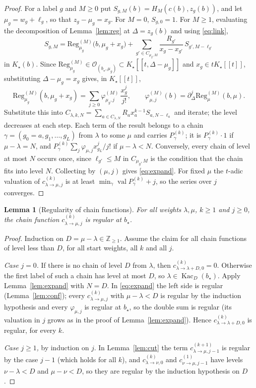 \documentclass[11pt]{article}
\newtheorem{lemma}[theorem]{Lemma}
\theoremstyle{definition}
\theoremstyle{remark}
\newcommand{\Kac}{\operatorname{Kac}}
\begin{document}
\begin{proof}
For a label $g$ and $M\ge0$ put $S_{g,M}(b)=H_M(c(b),z_g(b))$, and let
$\mu_g=w_g+\ell_g$, so that $z_g-\mu_g=x_g$.  For $M=0$, $S_{g,0}=1$.  For
$M\ge1$, evaluating the decomposition of Lemma~\ref{lem:reg} at
$\Delta=z_g(b)$ and using \eqref{eq:link},
\[
 S_{g,M}=\mathrm{Reg}^{(M)}_{\mu_g}\bigl(b,\mu_g+x_g\bigr)
 +\sum_{g'\in C_{\mu_g,M}}\frac{R_{g'}}{x_g-x_{g'}}\,S_{g',M-\ell_{g'}}
\]
in $K_\star(b)$.  Since $\mathrm{Reg}^{(M)}_{\mu_g}\in\mathcal O_{(b_\star,\mu_g)}
\subset K_\star[[t,\Delta-\mu_g]]$ and $x_g\in tK_\star[[t]]$, substituting
$\Delta-\mu_g=x_g$ gives, in $K_\star[[t]]$,
\[
 \mathrm{Reg}^{(M)}_{\mu_g}(b,\mu_g+x_g)=\sum_{j\ge0}\varphi^{(M)}_{\mu_g,j}\,
 \frac{x_g^j}{j!},\qquad
 \varphi^{(M)}_{\mu,j}(b)=\partial_\Delta^j\mathrm{Reg}^{(M)}_\mu(b,\mu).
\]  Substitute this into
$C_{\lambda,k,N}=\sum_{a\in C_{\lambda,N}}R_ax_a^{k-1}S_{a,N-\ell_a}$ and iterate;
the level decreases at each step.  Each term of the result belongs to a chain
$\gamma=(g_0=a,g_1,\dots,g_L)$ from $\lambda$ to some $\mu$ and carries
$P^{(k)}_\gamma$; it is $P^{(k)}_\gamma\cdot1$ if $\mu-\lambda=N$, and
$P^{(k)}_\gamma\sum_j\varphi_{\mu,j}x_{g_L}^j/j!$ if $\mu-\lambda<N$.  Conversely,
every chain of level at most $N$ occurs once, since $\ell_{g'}\le M$ in
$C_{\mu_g,M}$ is the condition that the chain fits into level $N$.  Collecting by
$(\mu,j)$ gives \eqref{eq:expand}.  For fixed $\mu$ the $t$-adic valuation of
$c^{(k)}_{\lambda\to\mu,j}$ is at least $\min_\gamma\operatorname{val}P^{(k)}_\gamma+j$,
so the series over $j$ converges.
\end{proof}

\begin{lemma}[Regularity of chain functions]\label{lem:regular}
For all weights $\lambda,\mu$, $k\ge1$ and $j\ge0$, the chain function
$c^{(k)}_{\lambda\to\mu,j}$ is regular at $b_\star$.
\end{lemma}

\begin{proof}
Induction on $D=\mu-\lambda\in\mathbb Z_{\ge1}$.  Assume the claim for all
chain functions of level less than $D$, for all start weights, all $k$ and all
$j$.

\emph{Case $j=0$.}  If there is no chain of level $D$ from $\lambda$, then
$c^{(k)}_{\lambda\to\lambda+D,0}=0$.  Otherwise the first label of such a chain
has level at most $D$, so $\lambda\in\Kac_D(b_\star)$.  Apply
Lemma~\ref{lem:expand} with $N=D$.  In \eqref{eq:expand} the left side is
regular (Lemma~\ref{lem:conf}); every $c^{(k)}_{\lambda\to\mu,j}$ with
$\mu-\lambda<D$ is regular by the induction hypothesis and every
$\varphi_{\mu,j}$ is regular at $b_\star$, so the double sum is regular (its valuation in
$j$ grows as in the proof of Lemma~\ref{lem:expand}).  Hence
$c^{(k)}_{\lambda\to\lambda+D,0}$ is regular, for every $k$.

\emph{Case $j\ge1$,} by induction on $j$.  In Lemma~\ref{lem:cut} the term
$c^{(k+1)}_{\lambda\to\mu,j-1}$ is regular by the case $j-1$ (which holds for
all $k$), and $c^{(k)}_{\lambda\to\nu,0}$ and $c^{(1)}_{\nu\to\mu,j-1}$ have
levels $\nu-\lambda<D$ and $\mu-\nu<D$, so they are regular by the induction
hypothesis on $D$.
\end{proof}
\end{document}
